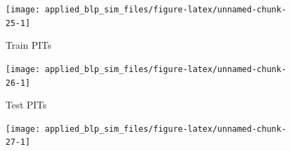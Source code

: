 \documentclass[
]{article}
\begin{document}
\clearpage

\begin{figure}[h]

{\centering \texttt{[image: applied\_blp\_sim\_files/figure-latex/unnamed-chunk-25-1]} 

}

\caption{Train PITs}\label{fig:unnamed-chunk-25}
\end{figure}

\clearpage

\begin{figure}[h]

{\centering \texttt{[image: applied\_blp\_sim\_files/figure-latex/unnamed-chunk-26-1]} 

}

\caption{Test PITs}\label{fig:unnamed-chunk-26}
\end{figure}

\clearpage

\begin{figure}[h]

{\centering \texttt{[image: applied\_blp\_sim\_files/figure-latex/unnamed-chunk-27-1]} 

}

\end{figure}
\end{document}
